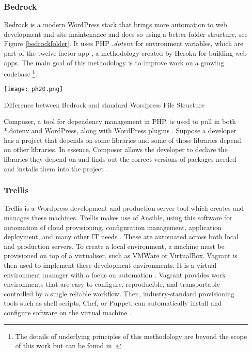 \documentclass[fontsize=11pt]{extarticle}
\numberwithin{figure}{section} %
\numberwithin{table}{section}%
\begin{document}
\hypertarget{bedrock}{%
\subsubsection{Bedrock}\label{bedrock}}

Bedrock is a modern WordPress stack that brings more automation to web
development and site maintenance and does so using a better folder
structure, see Figure \ref{bedrockfolder}. It uses PHP \emph{.dotenv}
for environment variables, which are part of the twelve-factor app
\cite{p6}, a methodology created by Heroku for building web
apps\cite{p5}. The main goal of this methodology is to improve work on a
growing codebase
\footnote{The details of underlying principles of this methodology are beyond the scope of this work but can be found in \cite{p8}.}.

\begin{table}[H]
      \centering
      \texttt{[image: ph20.png]}
      \caption{Difference between Bedrock and standard Wordpress File Structure}
\label{bedrockfolder}
 \end{table}

Composer, a tool for dependency management in PHP, is used to pull in
both *.dotenv and WordPress, along with WordPress plugins \cite{p7}.
Suppose a developer has a project that depends on some libraries and
some of those libraries depend on other libraries. In essence, Composer
allows the developer to declare the libraries they depend on and finds
out the correct versions of packages needed and installs them into the
project \cite{p8}.

\hypertarget{trellis}{%
\subsubsection{Trellis}\label{trellis}}

Trellis is a Wordpress development and production server tool which
creates and manages these machines. Trellis makes use of Ansible, using
this software for automation of cloud provisioning, configuration
management, application deployment, and many other IT needs \cite{p12}.
These are automated across both local and production servers. To create
a local environment, a machine must be provisioned on top of a
virtualiser, such as VMWare or VirtualBox. Vagrant is then used to
implement these development environments. It is a virtual environment
manager with a focus on automation \cite{p10}. Vagrant provides work
environments that are easy to configure, reproducible, and transportable
controlled by a single reliable workflow. Then, industry-standard
provisioning tools such as shell scripts, Chef, or Puppet, can
automatically install and configure software on the virtual machine
\cite{p10}.
\end{document}
